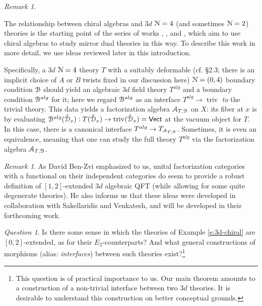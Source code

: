 \documentclass[reqno,11pt]{amsart}
\numberwithin{equation}{subsection}
\theoremstyle{remark}
\newtheorem{rem}[thm]{Remark}
\newtheorem{question}[thm]{Question}
\newcommand{\sA}{{\EuScript A}}
\newcommand{\sB}{{\EuScript B}}
\newcommand{\sD}{{\EuScript D}}
\newcommand{\sN}{{\EuScript N}}
\newcommand{\on}{\operatorname}
\newcommand{\Vect}{\mathsf{Vect}}
\renewcommand{\o}[1]{\mathring{#1}}
\begin{document}
\begin{rem}\label{r:voa-3d}

The relationship between chiral algebras and $3d$ $\sN = 4$ (and
sometimes $\sN = 2$) theories is the starting point of the series of
works \cite{voa-3d}, \cite{ccg}, and \cite{cdg}, which aim to use
chiral algebras to 
study mirror dual theories in this way. To describe this work in more detail,
we use ideas reviewed later in this introduction. 

Specifically, a $3d$ $\sN = 4$
theory $T$ with a suitably deformable 
(cf. \cite{voa-3d} \S 2.3; there is an implicit
choice of $A$ or $B$ twists fixed in our discussion here) 
$\sN = (0,4)$ boundary condition $\sB$ should yield an 
algebraic $3d$ field theory $T^{alg}$ 
and a boundary condition $\sB^{alg}$ for it; here
we regard $\sB^{alg}$ as an interface $T^{alg} \to \on{triv}$ 
\emph{to} the trivial theory. 
This data yields a factorization algebra $\sA_{T,\sB}$ on $X$: its fiber at $x$
is by evaluating $\sB^{alg}(\o{\sD}_x):T(\o{\sD}_x) \to \on{triv}(\o{\sD}_x) = \Vect$
at the vacuum object for $T$. In this case, there is a canonical
interface $T^{alg} \to T_{\sA_{T,\sB}}$. Sometimes, it is even an equivalence,
meaning that one can study the full theory $T^{alg}$ via the factorization
algebra $\sA_{T,\sB}$. 

\end{rem}

\begin{rem}

As David Ben-Zvi emphasized to us, unital factorization categories
with a functional on their independent categories
do seem to provide a robust
definition of $[1,2]$-extended $3d$ algebraic QFT (while allowing for
some quite degenerate theories). He also informs us that
these ideas were developed in collaboration with Sakellaridis and Venkatesh,
and will be developed in their forthcoming work. 

\end{rem}

\begin{question}

Is there some sense in which the theories of Example \ref{e:3d-chiral}
are $[0,2]$-extended, as for their $E_2$-counterparts? 
And what general constructions of morphisms
(alias: \emph{interfaces}) between such theories exist?\footnote{This question
is of practical importance to us. Our
main theorem amounts to a construction of a non-trivial interface 
between two $3d$ theories. It is desirable to understand this construction on 
better conceptual grounds.}

\end{question}
\end{document}
